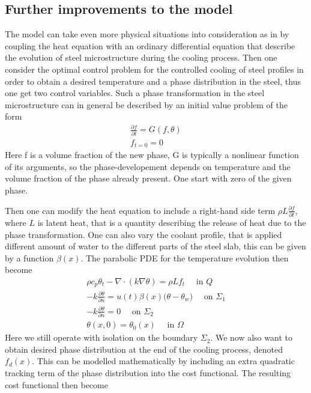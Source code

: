 
\subsection{Further improvements to the model}
The model can take even more physical situations into consideration as in \cite{DPSteelOverview} by coupling the  heat equation with an ordinary differential equation that describe the evolution of steel microstructure during the cooling process. Then one consider the optimal control problem for the controlled cooling of steel profiles in order to obtain a desired temperature and a phase distribution in the steel, thus one get two control variables. Such a phase transformation in the steel microstructure can in general be described by an initial value problem of the form 
\begin{align*}
    \frac{\partial f}{\partial t} = G(f,\theta ) \\
    f_{t=0} = 0
\end{align*}
Here f is a volume fraction of the new phase, G is typically a nonlinear function of its arguments, so the phase-developement depends on temperature and the volume fraction of the phase already present. One start with zero of the given phase. 

Then one can modify the heat equation to include a right-hand side term $\rho L \frac{\partial f}{\partial t}$, where $L$ is latent heat, that is a quantity describing the release of heat due to the phase transformation. One can also vary the coolant profile, that is applied different amount of water to the different parts of the steel slab, this can be given by a function $\beta (x)$. The parabolic PDE for the temperature evolution then become 
\begin{align*}
    \rho c_p \theta_t - \nabla \cdot (k\nabla \theta) = \rho L f_t \quad \textrm{ in } Q \\
    - k \frac{\partial \theta}{\partial n} = u(t)\beta(x) \bigg (\theta - \theta_w \bigg ) \quad \textrm{ on } \Sigma_1 \\
    -k \frac{\partial \theta}{\partial n} = 0 \quad \textrm{ on } \Sigma_2 \\
    \theta(x,0) = \theta_0(x) \quad \textrm{ in } \Omega
\end{align*}
Here we still operate with isolation on the boundary $\Sigma_2$. We now also want to obtain desired phase distribution at the end of the cooling process, denoted $f_d(x)$. This can be modelled mathematically by including an extra quadratic tracking term of the phase distribution into the cost functional. The resulting cost functional then become


